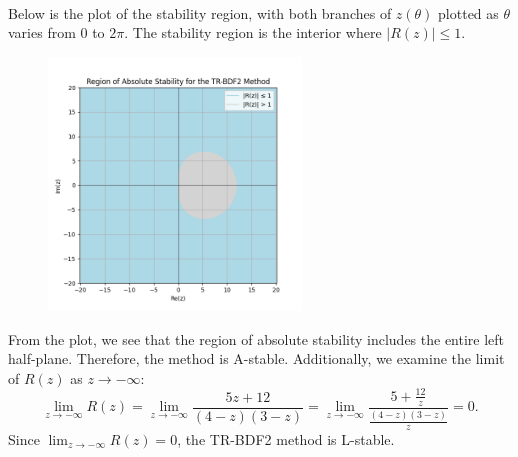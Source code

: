 \documentclass{article}
\begin{document}
\begin{enumerate}[(a)]
\begin{align*}
    \end{align*}
    Below is the plot of the stability region, with both branches of $z(\theta)$ plotted as $\theta$ varies from $0$ to $2\pi$. The stability region is the interior where $|R(z)| \leq 1$.
    \begin{figure}[H]
        \centering
        \includegraphics[width=0.6\textwidth]{Q2b.png}
    \end{figure}
    \noindent From the plot, we see that the region of absolute stability includes the entire left half-plane. Therefore, the method is A-stable. Additionally, we examine the limit of $R(z)$ as $z \to -\infty$:
    \[
        \lim_{z \to -\infty} R(z) = \lim_{z \to -\infty} \frac{5z + 12}{(4-z)(3 - z)} = \lim_{z \to -\infty} \frac{5 + \frac{12}{z}}{\frac{(4-z)(3 - z)}{z}} = 0.
    \]
    Since $\lim_{z \to -\infty} R(z) = 0$, the TR-BDF2 method is L-stable.

  \end{enumerate}
\end{document}
